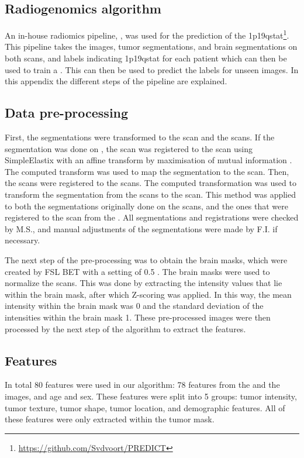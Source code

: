\begin{subappendices}
\section{Radiogenomics algorithm}\label{app:LGG_1p19q_algorithm}
An in-house radiomics pipeline, , was used for the prediction of the \acl{1p19qstat}\footnote{\url{https://github.com/Svdvoort/PREDICT}}.
This pipeline takes the    images, tumor segmentations, and brain segmentations on both scans, and labels indicating \acl{1p19qstat} for each patient which can then be used to train a  \autocite{cortes1995support}.
This  can then be used to predict the labels for unseen images. In this appendix the different steps of the pipeline are explained.

\subsection{Data pre-processing}
First, the segmentations were transformed to the  scan and the  scans.
If the segmentation was done on , the  scan was registered to the  scan using SimpleElastix with an affine transform by maximisation of mutual information \autocite{marstal2016simpleelastix}.
The computed transform was used to map the  segmentation to the  scan.
Then, the  scans were registered to the  scans.
The computed transformation was used to transform the segmentation from the  scans to the  scan.
This method was applied to both the segmentations originally done on the  scans, and the ones that were registered to the  scan from the .
All segmentations and registrations were checked by M.S., and manual adjustments of the segmentations were made by F.I. if necessary.

The next step of the pre-processing was to obtain the brain masks, which were created by FSL BET with a setting of 0.5 \autocite{smith2002fast}.
The brain masks were used to normalize the scans.
This was done by extracting the intensity values that lie within the brain mask, after which Z-scoring was applied.
In this way, the mean intensity within the brain mask was 0 and the standard deviation of the intensities within the brain mask 1.
These pre-processed images were then processed by the next step of the algorithm to extract the features.

\subsection{Features}
In total 80 features were used in our algorithm: 78 features from the  and the  images, and age and sex.
These features were split into 5 groups: tumor intensity, tumor texture, tumor shape, tumor location, and demographic features.
All of these features were only extracted within the tumor mask.


\end{subappendices}

